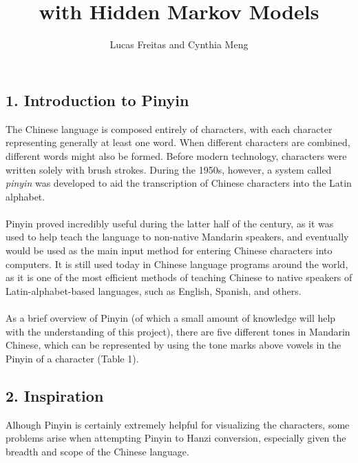 \documentclass[11pt, twocolumn]{article}
\makeatletter
\newenvironment{problem x}{\@startsection
       {section}
       {1}
       {-.2em}
       {-3.5ex plus -1ex minus -.2ex}
       {2.3ex plus .2ex}
       {\pagebreak[3] %
       \large\bf\noindent{Problem }
       }
       }
       {%
       \begin{center}\large\bf \ldots\ldots\ldots\end{center}}
\makeatother
\begin{document}
\title{\\with Hidden Markov Models}
\author{Lucas Freitas and Cynthia Meng}

\maketitle

\thispagestyle{empty}

\subsection*{1. Introduction to Pinyin}

The Chinese language is composed entirely of characters, with each character representing generally at least one word. When different characters are combined, different words might also be formed. Before modern technology, characters were written solely with brush strokes. During the 1950s, however, a system called \emph{pinyin} was developed to aid the transcription of Chinese characters into the Latin alphabet. 
\\\\
Pinyin proved incredibly useful during the latter half of the century, as it was used to help teach the language to non-native Mandarin speakers, and eventually would be used as the main input method for entering Chinese characters into computers. It is still used today in Chinese language programs around the world, as it is one of the most efficient methods of teaching Chinese to native speakers of Latin-alphabet-based languages, such as English, Spanish, and others.
\\\\
As a brief overview of Pinyin (of which a small amount of knowledge will help with the understanding of this project), there are five different tones in Mandarin Chinese, which can be represented by using the tone marks above vowels in the Pinyin of a character (Table 1).

\subsection*{2. Inspiration}

Alhough Pinyin is certainly extremely helpful for visualizing the characters, some problems arise when attempting Pinyin to Hanzi conversion, especially given the breadth and scope of the Chinese language.\\
\end{document}
